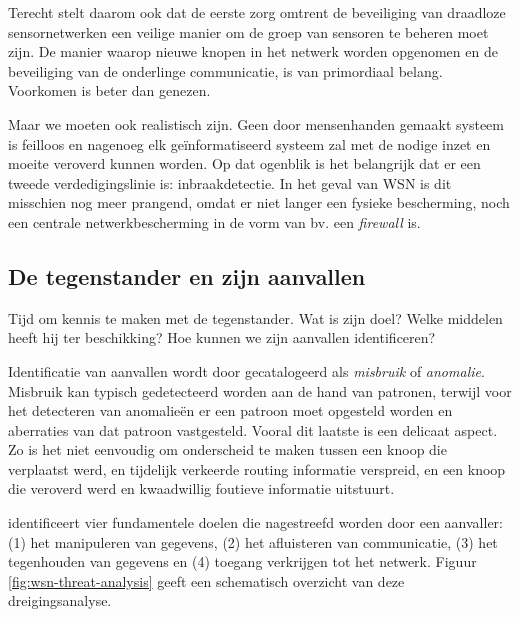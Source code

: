 Terecht stelt \citep{perrig2004security} daarom ook dat de eerste zorg omtrent
de beveiliging van draadloze sensornetwerken een veilige manier om de groep van
sensoren te beheren moet zijn. De manier waarop nieuwe knopen in het netwerk
worden opgenomen en de beveiliging van de onderlinge communicatie, is van
primordiaal belang. Voorkomen is beter dan genezen.

Maar we moeten ook realistisch zijn. Geen door mensenhanden gemaakt systeem is
feilloos en nagenoeg elk ge\"informatiseerd systeem zal met de nodige inzet en
moeite veroverd kunnen worden. Op dat ogenblik is het belangrijk dat er een
tweede verdedigingslinie is: inbraakdetectie. In het geval van WSN is dit
misschien nog meer prangend, omdat er niet langer een fysieke bescherming, noch
een centrale netwerkbescherming in de vorm van bv. een \emph{firewall} is.

\subsection{De tegenstander en zijn aanvallen}

Tijd om kennis te maken met de tegenstander. Wat is zijn doel? Welke middelen
heeft hij ter beschikking? Hoe kunnen we zijn aanvallen identificeren?

Identificatie van aanvallen wordt door \citep{zhang2000intrusion} gecatalogeerd
als \emph{misbruik} of \emph{anomalie}. Misbruik kan typisch gedetecteerd
worden aan de hand van patronen, terwijl voor het detecteren van anomalie\"en
er een patroon moet opgesteld worden en aberraties van dat patroon vastgesteld.
Vooral dit laatste is een delicaat aspect. Zo is het niet eenvoudig om
onderscheid te maken tussen een knoop die verplaatst werd, en tijdelijk
verkeerde routing informatie verspreid, en een knoop die veroverd werd en
kwaadwillig foutieve informatie uitstuurt.

\citep{aschenbruck2012security} identificeert vier fundamentele doelen die
nagestreefd worden door een aanvaller: (1) het manipuleren van gegevens, (2)
het afluisteren van communicatie, (3) het tegenhouden van gegevens en (4)
toegang verkrijgen tot het netwerk. Figuur \ref{fig:wsn-threat-analysis} geeft
een schematisch overzicht van deze dreigingsanalyse.

